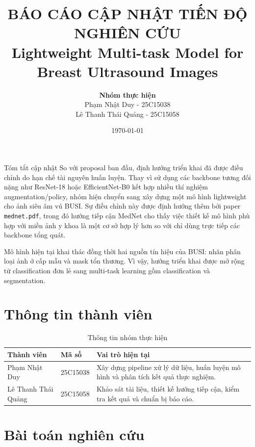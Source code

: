 \documentclass[12pt,a4paper]{article}
\title{
    \vspace{-1.2cm}
    \textbf{\textcolor{mainblue}{BÁO CÁO CẬP NHẬT TIẾN ĐỘ NGHIÊN CỨU}}\\[0.25em]
    \large Lightweight Multi-task Model for Breast Ultrasound Images
}
\author{
    \textbf{Nhóm thực hiện}\\[0.3em]
    Phạm Nhật Duy - 25C15038 \\
    Lê Thanh Thái Quảng - 25C15058
}
\date{\today}
\begin{document}
\maketitle

\begin{ideabox}{Tóm tắt cập nhật}
So với proposal ban đầu, định hướng triển khai đã được điều chỉnh do hạn chế tài nguyên huấn luyện. Thay vì sử dụng các backbone tương đối nặng như ResNet-18 hoặc EfficientNet-B0 kết hợp nhiều thí nghiệm augmentation/policy, nhóm hiện chuyển sang xây dựng một mô hình lightweight cho ảnh siêu âm vú BUSI. Sự điều chỉnh này được định hướng thêm bởi paper \texttt{mednet.pdf}, trong đó hướng tiếp cận MedNet cho thấy việc thiết kế mô hình phù hợp với miền ảnh y khoa là một cơ sở hợp lý hơn so với chỉ dùng trực tiếp các backbone tổng quát.

Mô hình hiện tại khai thác đồng thời hai nguồn tín hiệu của BUSI: nhãn phân loại ảnh ở cấp mẫu và mask tổn thương. Vì vậy, hướng triển khai được mở rộng từ classification đơn lẻ sang multi-task learning gồm classification và segmentation.
\end{ideabox}

\section{Thông tin thành viên}

\begin{table}[H]
\centering
\caption{Thông tin nhóm thực hiện}
\renewcommand{\arraystretch}{1.25}
\begin{tabular}{p{4.2cm} p{3.2cm} p{7.2cm}}
\toprule
\textbf{Thành viên} & \textbf{Mã số} & \textbf{Vai trò hiện tại} \\
\midrule
Phạm Nhật Duy & 25C15038 & Xây dựng pipeline xử lý dữ liệu, huấn luyện mô hình và phân tích kết quả thực nghiệm. \\
Lê Thanh Thái Quảng & 25C15058 & Khảo sát tài liệu, thiết kế hướng tiếp cận, kiểm tra kết quả và chuẩn bị báo cáo. \\
\bottomrule
\end{tabular}
\end{table}

\section{Bài toán nghiên cứu}
\end{document}

